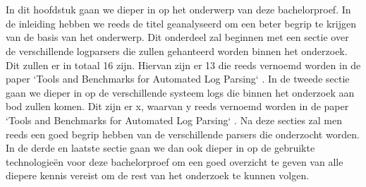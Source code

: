 \chapter{}
\label{ch:stand-van-zaken}






In dit hoofdstuk gaan we dieper in op het onderwerp van deze bachelorproef. In de inleiding hebben we reeds de titel geanalyseerd om een beter begrip te krijgen van de basis van het onderwerp. Dit onderdeel zal beginnen met een sectie over de verschillende logparsers die zullen gehanteerd worden binnen het onderzoek. Dit zullen er in totaal 16 zijn. Hiervan zijn er 13 die reeds vernoemd worden in de paper `Tools and Benchmarks for Automated Log Parsing` \autocite{TBA2019}. In de tweede sectie gaan we dieper in op de verschillende systeem logs die binnen het onderzoek aan bod zullen komen. Dit zijn er x, waarvan y reeds vernoemd worden in de paper `Tools and Benchmarks for Automated Log Parsing` \autocite{TBA2019}. Na deze secties zal men reeds een goed begrip hebben van de verschillende parsers die onderzocht worden. In de derde en laatste sectie gaan we dan ook dieper in op de gebruikte technologieën voor deze bachelorproef om een goed overzicht te geven van alle diepere kennis vereist om de rest van het onderzoek te kunnen volgen.

